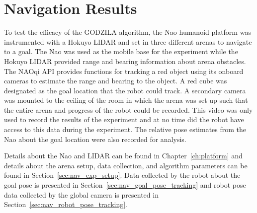 \chapter{Navigation Results} \label{ch:results_navigation}



To test the efficacy of the GODZILA algorithm, the Nao humanoid platform was instrumented with
a Hokuyo LIDAR and set in three different arenas to navigate to a goal. The Nao was used as the mobile
base for the experiment while the Hokuyo LIDAR provided range and bearing information about
arena obstacles. The NAOqi API provides functions for tracking a red object using its onboard cameras
to estimate the range and bearing to the object. A red cube was designated as the goal location
that the robot could track. 
A secondary camera was mounted to the ceiling of the room in which the
arena was set up such that the entire arena and progress of the robot could be recorded.
This video was only used to record the results of the experiment and at no time did the robot
have access to this data during the experiment. The relative pose estimates from the Nao about
the goal location were also recorded for analysis.

Details about the Nao and LIDAR can be found in Chapter~\ref{ch:platform} and details about 
the arena setup, data collection, and algorithm parameters can be found in Section~\ref{sec:nav_exp_setup}.
Data collected by the robot about the goal pose is presented in Section~\ref{sec:nav_goal_pose_tracking}
and robot pose data collected by the global camera is presented in Section~\ref{sec:nav_robot_pose_tracking}.

